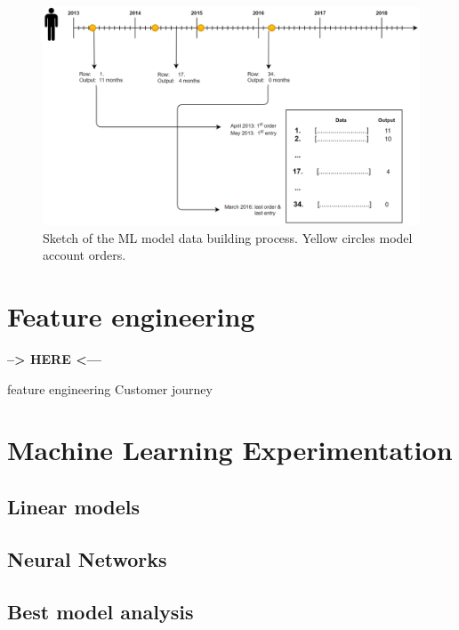 \begin{figure}[h]
    \centering
    \includegraphics[width=14cm]{images/data-build-ml-example.png}
    \caption{Sketch of the ML model data building process. Yellow circles model account orders.}
    \label{fig:data-build-example}
\end{figure}

\section{Feature engineering} \label{sec:ml-features}

\begin{center}\textbf{--> HERE <---}\end{center}

feature engineering
Customer journey




\section{Machine Learning Experimentation} \label{sec:ml-experimentation}
\lipsum[1]

\subsection{Linear models}
\lipsum[2]

\subsection{Neural Networks}
\lipsum[3]

\subsection{Best model analysis}
\lipsum[3]


